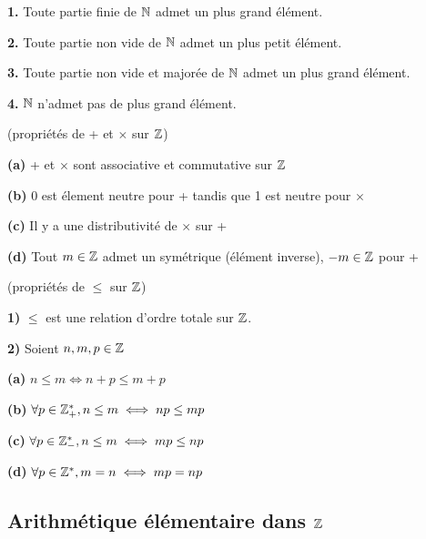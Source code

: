 \documentclass[a4paper, 12pt]{article}
\begin{document}
\begin{theorem}
    \item \textbf{1.} Toute partie finie de $\mathbb{N}$ admet un plus grand élément.
    \item \textbf{2.} Toute partie non vide de $\mathbb{N}$ admet un plus petit élément.
    \item \textbf{3.} Toute partie non vide et majorée de $\mathbb{N}$ admet un plus grand élément.
    \item \textbf{4.} $\mathbb{N}$ n'admet pas de plus grand élément.
\end{theorem}

\begin{theorem}
    (propriétés de + et $\times$ sur $\mathbb{Z}$)
    \item \textbf{(a)} + et $\times$ sont associative et commutative sur $\mathbb{Z}$

    \item \textbf{(b)} 0 est élement neutre pour + tandis que 1 est neutre pour $\times$

    \item \textbf{(c)} Il y a une distributivité de $\times$ sur +

    \item \textbf{(d)} Tout $m \in \mathbb{Z}$ admet un symétrique (élément inverse), $-m \in \mathbb{Z}$ pour +
\end{theorem}

\begin{theorem}
    (propriétés de $\leq$ sur $\mathbb{Z}$)

    \item \textbf{1)} $\leq$ est une relation d'ordre totale sur $\mathbb{Z}$.
    
    \item \textbf{2)} Soient $n, m, p \in \mathbb{Z}$
    
    \item \textbf{(a)} $n \leq m \iff n + p \leq m + p$
    \item \textbf{(b)} $\forall p \in \mathbb{Z}_+^*, n \leq m \iff np \leq mp$
    \item \textbf{(c)} $\forall p \in \mathbb{Z}_-^*, n \leq m \iff mp \leq np$
    \item \textbf{(d)} $\forall p \in \mathbb{Z}^*, m = n \iff mp = np$
\end{theorem}




\subsection{Arithmétique élémentaire dans $\mathbb{Z}$}
\end{document}
